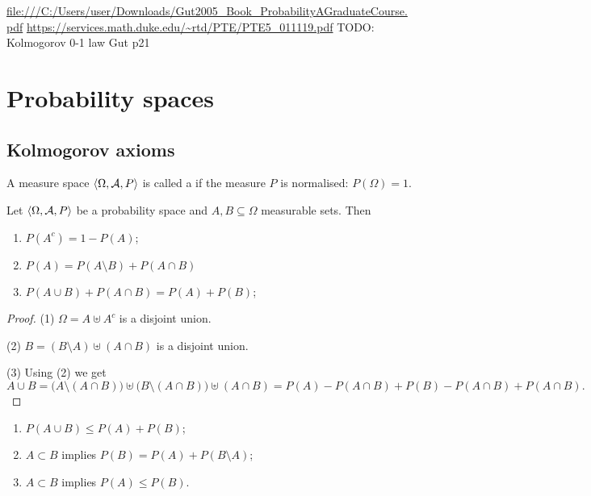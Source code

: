 \url{file:///C:/Users/user/Downloads/Gut2005_Book_ProbabilityAGraduateCourse.pdf}
\url{https://services.math.duke.edu/~rtd/PTE/PTE5_011119.pdf}
TODO: Kolmogorov 0-1 law Gut p21

\chapter{Probability spaces}
\section{Kolmogorov axioms}
\begin{definition}
A measure space $\langle \Omega, \mathcal{A}, P \rangle$ is called a  if the measure $P$ is normalised: $P(\Omega) = 1$.
\end{definition}

\begin{lemma}
Let $\langle \Omega, \mathcal{A}, P \rangle$ be a probability space and $A,B\subseteq \Omega$ measurable sets. Then
\begin{enumerate}
\item $P(A^c)= 1- P(A)$;
\item $P(A) = P(A\setminus B)+P(A\cap B)$
\item $P(A\cup B)+P(A\cap B) = P(A) + P(B)$;
\end{enumerate}
\end{lemma}
\begin{proof}
(1) $\Omega = A\uplus A^c$ is a disjoint union.

(2) $B = (B\setminus A)\uplus (A\cap B)$ is a disjoint union.

(3) Using (2) we get
\[ A\cup B = \Big(A\setminus (A\cap B)\Big) \uplus \Big(B\setminus (A\cap B)\Big) \uplus (A\cap B) = P(A) - P(A\cap B) + P(B)- P(A\cap B)+ P(A\cap B). \]
\end{proof}
\begin{corollary} \mbox{}
\begin{enumerate}
\item $P(A\cup B) \leq P(A) + P(B)$;
\item $A\subset B$ implies $P(B)= P(A) + P(B\setminus A)$;
\item $A\subset B$ implies $P(A) \leq P(B)$.
\end{enumerate}
\end{corollary}

